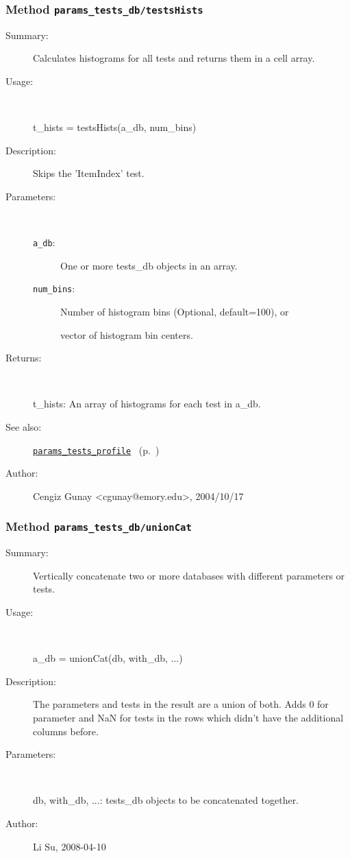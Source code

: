 \subsubsection[Method \texttt{testsHists}]{Method \texttt{params\_tests\_db/testsHists}}%
%
\label{ref_params_tests_db__testsHists}%
\hypertarget{ref_params_tests_db__testsHists}{}%
\begin{description}
\item[Summary:]Calculates histograms for all tests and returns them in a cell array.
%
\item[Usage:]~%
\begin{lyxcode}%
t\_hists = testsHists(a\_db, num\_bins)
%
\end{lyxcode}%
%
\item[Description:]%
Skips the 'ItemIndex' test.
\item[Parameters:]~
\begin{description}%
\item[\texttt{a\_db}:]
 One or more tests\_db objects in an array.
\item[\texttt{num\_bins}:]
 Number of histogram bins (Optional, default=100), or

vector of histogram bin centers.
\end{description}%
%
\item[Returns:
]~

	t\_hists: An array of histograms for each test in a\_db.
%
%
\item[See also:]%
\hyperlink{ref_params_tests_profile}{\texttt{params\_tests\_profile}}%
\ (p.~\pageref{ref_params_tests_profile})%
%
%
\item[Author:]%
Cengiz Gunay <cgunay@emory.edu>, 2004/10/17
%
\end{description}
\methodline%
\subsubsection[Method \texttt{unionCat}]{Method \texttt{params\_tests\_db/unionCat}}%
%
\label{ref_params_tests_db__unionCat}%
\hypertarget{ref_params_tests_db__unionCat}{}%
\begin{description}
\item[Summary:]Vertically concatenate two or more databases with different parameters or tests.
%
\item[Usage:]~%
\begin{lyxcode}%
a\_db = unionCat(db, with\_db, ...)
%
\end{lyxcode}%
%
\item[Description:]%
The parameters and tests in the result are a union of both. Adds 0 for
 parameter and NaN for tests in the rows which didn't have the additional
 columns before.
\item[Parameters:]~

db, with\_db, ...: tests\_db objects to be concatenated together.
%
%
%
%
\item[Author:]%
Li Su, 2008-04-10
%
\end{description}
\methodline%
